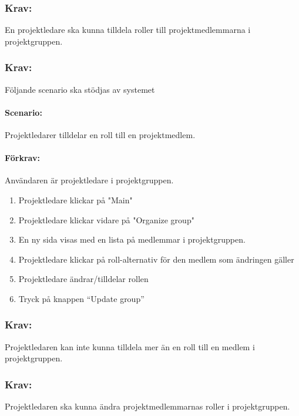 \documentclass[paper=a4, fontsize=11pt,twoside]{article}
\begin{document}
\subsubsection{Krav:} En projektledare ska kunna tilldela roller till projektmedlemmarna i projektgruppen.

\paragraph{}
\subsubsection{Krav:}
Följande scenario ska stödjas av systemet
\paragraph{Scenario:}
Projektledarer tilldelar en roll till en projektmedlem.
\paragraph{Förkrav:}
Användaren är projektledare i projektgruppen.
\begin{enumerate} 
\item Projektledare klickar på "Main"
\item Projektledare klickar vidare på "Organize group"
\item En ny sida visas med en lista på medlemmar i projektgruppen.
\item Projektledare klickar på roll-alternativ för den medlem som ändringen gäller
\item Projektledare ändrar/tilldelar rollen
\item Tryck på knappen “Update group”
\end{enumerate}

\paragraph{}
\subsubsection{Krav:}
	Projektledaren kan inte kunna tilldela mer än en roll till en medlem i projektgruppen.

\paragraph{}
\subsubsection{Krav:}
	Projektledaren ska kunna ändra projektmedlemmarnas roller i projektgruppen.
\end{document}

